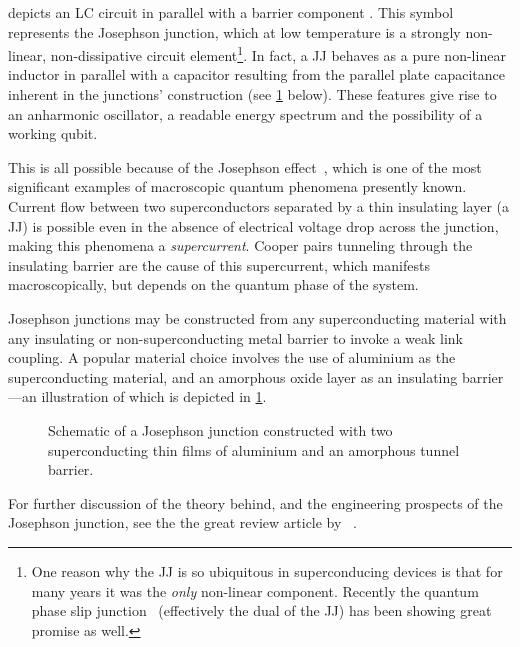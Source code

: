  depicts an LC circuit in parallel with a barrier component  \resizebox{!}{0.6em}{}.
This symbol represents the Josephson junction, which at low temperature is a strongly non-linear, non-dissipative circuit element\footnote{One reason why the JJ is so ubiquitous in superconducing devices is that for many years it was the \textit{only} non-linear component. Recently the quantum phase slip junction~\cite{Bezryadin2000,Mooij2006,Astafiev2012} (effectively the dual of the JJ) has been showing great promise as well.}.
In fact, a JJ behaves as a pure non-linear inductor in parallel with a capacitor resulting from the parallel plate capacitance inherent in the junctions' construction (see \cref{fig:jjdiagram} below).
These features give rise to an anharmonic oscillator, a readable energy spectrum and the possibility of a working qubit.

This is all possible because of the Josephson effect~\cite{Josephson1962,Josephson1965}, which is one of the most significant examples of macroscopic quantum phenomena presently known.
Current flow between two superconductors separated by a thin insulating layer (\ie a JJ) is possible even in the absence of electrical voltage drop across the junction, making this phenomena a \textit{supercurrent}.
Cooper pairs tunneling through the insulating barrier are the cause of this supercurrent, which manifests macroscopically, but depends on the quantum phase of the system.

Josephson junctions may be constructed from any superconducting material with any insulating or non-superconducting metal barrier to invoke a weak link coupling.
A popular material choice involves the use of aluminium as the superconducting material, and an amorphous oxide layer as an insulating barrier---an illustration of which is depicted in \cref{fig:jjdiagram}.

\begin{figure}[htp]
\resizebox{0.75\textwidth}{!}{}
\caption[Josephson Junction Schematic]{\label{fig:jjdiagram}Schematic of a Josephson junction constructed with two superconducting thin films of aluminium and an amorphous  tunnel barrier.}
\end{figure}

For further discussion of the theory behind, and the engineering prospects of the Josephson junction, see the the great review article by \citeauthor{Makhlin2001}~\cite{Makhlin2001}.

